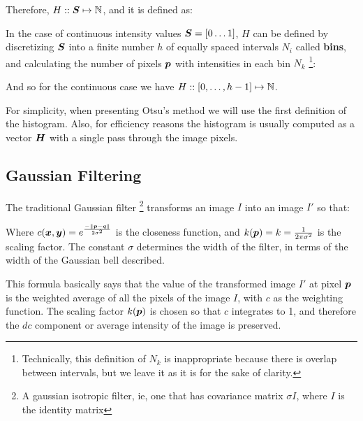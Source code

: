 

Therefore, $H :: \boldsymbol{S} \mapsto \mathbb{N}$, and it is defined as:

In the case of continuous intensity values $\boldsymbol{S}= [0 \dots 1]$, $H$ can be defined by discretizing $\boldsymbol{S}$ into a finite number $h$ of equally spaced intervals $N_i$ called \textbf{bins}, and calculating the number of pixels $\boldsymbol{p}$ with intensities in each bin $N_k$ \footnote{Technically, this definition of $N_k$ is inappropriate because there is overlap between intervals, but we leave it as it is for the sake of clarity.}:


And so for the continuous case we have $H ::  [0,\dots,h-1]  \mapsto \mathbb{N}$.

For simplicity, when presenting Otsu's method we will use the first definition of the histogram. Also, for efficiency reasons the histogram is usually computed as a vector $\boldsymbol{H}$ with a single pass through the image pixels.

\subsection{Gaussian Filtering}

The traditional Gaussian filter \footnote{A gaussian isotropic filter, ie, one that has covariance matrix $\sigma I$, where $I$ is the identity matrix} transforms an image $I$ into an image $I'$ so that:


Where $c(\boldsymbol{x},\boldsymbol{y})=   e^{ \frac{ -\left\lVert\boldsymbol{p}-\boldsymbol{q}\right\rVert }{2 \sigma^2 }}$ is the closeness function, and
$k(\boldsymbol{p})=k= \frac{1}{2 \pi \sigma^2}$ is the scaling factor. The constant $\sigma$ determines the width of the filter, in terms of the width of the Gaussian bell described.

This formula basically says that the value of the transformed image $I'$ at pixel $\boldsymbol{p}$ is the weighted average of all the pixels of the image $I$, with $c$ as the weighting function. The scaling factor $k(\boldsymbol{p})$ is chosen so that $c$ integrates to 1, and therefore the $dc$ component or average intensity of the image is preserved.


